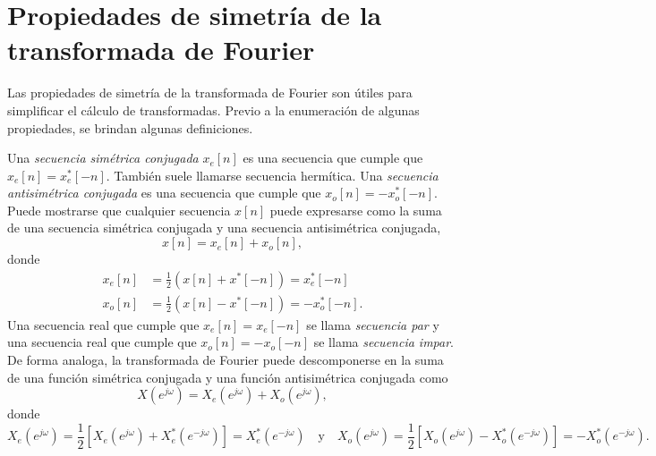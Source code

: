 \documentclass[a4paper]{report}
\begin{document}
\section{Propiedades de simetría de la transformada de Fourier}\label{sec:seq_and_sys_dtft_symmetry_properties} 
 
Las propiedades de simetría de la transformada de Fourier son útiles para simplificar el cálculo de transformadas. Previo a la enumeración de algunas propiedades, se brindan algunas definiciones. 

Una \emph{secuencia simétrica conjugada} \(x_e[n]\) es una secuencia que cumple que \(x_e[n]=x_e^*[-n]\). También suele llamarse secuencia hermítica. Una \emph{secuencia antisimétrica conjugada} es una secuencia que cumple que \(x_o[n]=-x_o^*[-n]\). Puede mostrarse que cualquier secuencia \(x[n]\) puede expresarse como la suma de una secuencia simétrica conjugada y una secuencia antisimétrica conjugada,
\[
 x[n]=x_e[n]+x_o[n],
\]
donde
\begin{align}
 x_e[n]&=\frac{1}{2}(x[n]+x^*[-n])=x_e^*[-n]\label{eq:seq_and_sys_dtft_symmetry_symmetric_decomposition}\\
 x_o[n]&=\frac{1}{2}(x[n]-x^*[-n])=-x_o^*[-n].\label{eq:seq_and_sys_dtft_symmetry_antisymmetric_decomposition}
\end{align}
Una secuencia real que cumple que \(x_e[n]=x_e[-n]\) se llama \emph{secuencia par} y una secuencia real que cumple que \(x_o[n]=-x_o[-n]\) se llama \emph{secuencia impar}. De forma analoga, la transformada de Fourier puede descomponerse en la suma de una función simétrica conjugada y una función antisimétrica conjugada como
\[
 X(e^{j\omega})=X_e(e^{j\omega})+X_o(e^{j\omega}),
\]
donde
\[
 X_e(e^{j\omega})=\frac{1}{2}[X_e(e^{j\omega})+X_e^*(e^{-j\omega})]=X_e^*(e^{-j\omega})
 \quad\textrm{y}\quad
 X_o(e^{j\omega})=\frac{1}{2}[X_o(e^{j\omega})-X_o^*(e^{-j\omega})]=-X_o^*(e^{-j\omega}).
\]
\end{document}
